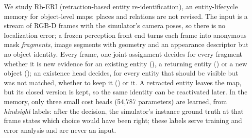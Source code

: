We study Rb-ERI (retraction-based entity re-identification), an entity-lifecycle memory for object-level maps; places and relations are not revised.
The input is a stream of RGB-D frames with the simulator's camera poses, so there is no localization error; a frozen perception front end turns each frame into anonymous mask \emph{fragments}, image segments with geometry and an appearance descriptor but no object identity.
Every frame, one joint assignment decides for every fragment whether it is new evidence for an existing entity (), a returning entity () or a new object (); an existence head decides, for every entity that should be visible but was not matched, whether to keep it () or  it.
A retracted entity leaves the map, but its closed version is kept, so the same identity can be reactivated later.
In the memory, only three small cost heads (54,787 parameters) are learned, from \emph{hindsight} labels: after the decision, the simulator's instance ground truth at that frame states which choice would have been right; these labels serve training and error analysis and are never an input.

